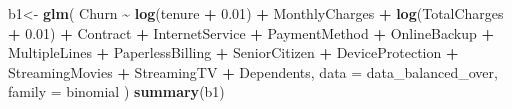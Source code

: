 \documentclass[
  twoside]{article}
\newenvironment{Shaded}{\begin{snugshade}}{\end{snugshade}}
\newcommand{\AttributeTok}[1]{\textcolor[rgb]{0.13,0.29,0.53}{#1}}
\newcommand{\FloatTok}[1]{\textcolor[rgb]{0.00,0.00,0.81}{#1}}
\newcommand{\FunctionTok}[1]{\textcolor[rgb]{0.13,0.29,0.53}{\textbf{#1}}}
\newcommand{\NormalTok}[1]{#1}
\newcommand{\OtherTok}[1]{\textcolor[rgb]{0.56,0.35,0.01}{#1}}
\newcommand{\SpecialCharTok}[1]{\textcolor[rgb]{0.81,0.36,0.00}{\textbf{#1}}}
\begin{document}
\begin{Shaded}
\begin{Highlighting}[]
\NormalTok{b1}\OtherTok{\textless{}{-}} \FunctionTok{glm}\NormalTok{(}
\NormalTok{  Churn }\SpecialCharTok{\textasciitilde{}} \FunctionTok{log}\NormalTok{(tenure }\SpecialCharTok{+} \FloatTok{0.01}\NormalTok{)}
  \SpecialCharTok{+}\NormalTok{ MonthlyCharges}
  \SpecialCharTok{+} \FunctionTok{log}\NormalTok{(TotalCharges }\SpecialCharTok{+} \FloatTok{0.01}\NormalTok{)}
  \SpecialCharTok{+}\NormalTok{ Contract  }\SpecialCharTok{+}\NormalTok{ InternetService }\SpecialCharTok{+}\NormalTok{ PaymentMethod }
  \SpecialCharTok{+}\NormalTok{ OnlineBackup }\SpecialCharTok{+}\NormalTok{ MultipleLines }\SpecialCharTok{+}\NormalTok{ PaperlessBilling }\SpecialCharTok{+}\NormalTok{ SeniorCitizen }
   \SpecialCharTok{+}\NormalTok{ DeviceProtection }\SpecialCharTok{+}\NormalTok{ StreamingMovies }\SpecialCharTok{+}\NormalTok{ StreamingTV }
  \SpecialCharTok{+}\NormalTok{ Dependents,}
  \AttributeTok{data =}\NormalTok{ data\_balanced\_over,}
  \AttributeTok{family =}\NormalTok{ binomial}
\NormalTok{)}
\FunctionTok{summary}\NormalTok{(b1)}
\end{Highlighting}
\end{Shaded}
\end{document}
